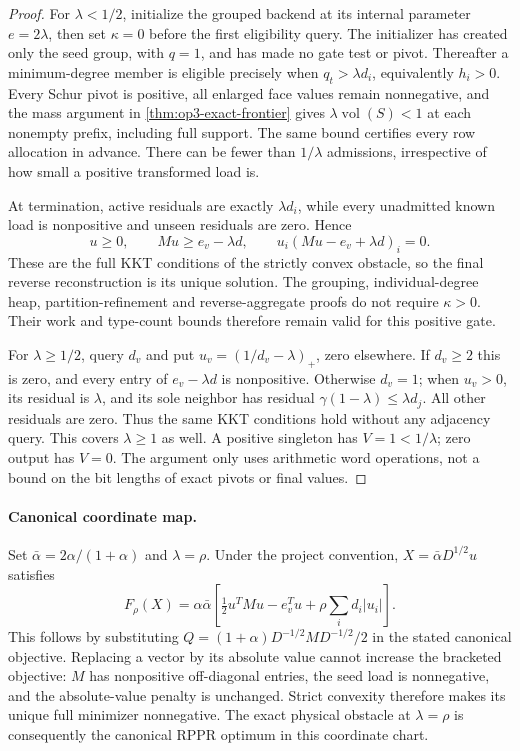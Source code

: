 \begin{proof}
For $\lambda<1/2$, initialize the grouped backend at its internal parameter
$e=2\lambda$, then set $\kappa=0$ before the first eligibility query.
The initializer has created only the seed group, with $q=1$, and has made
no gate test or pivot. Thereafter a minimum-degree member is eligible
precisely when $q_t>\lambda d_i$, equivalently $h_i>0$.
Every Schur pivot is positive, all enlarged face values remain nonnegative,
and the mass argument in \cref{thm:op3-exact-frontier} gives
$\lambda\operatorname{vol}(S)<1$ at each nonempty prefix, including full
support. The same bound certifies every row allocation in advance.
There can be fewer than $1/\lambda$ admissions, irrespective of how small
a positive transformed load is.

At termination, active residuals are exactly $\lambda d_i$, while every
unadmitted known load is nonpositive and unseen residuals are zero. Hence
\[
 u\geq0,\qquad M u\geq e_v-\lambda d,\qquad
 u_i(Mu-e_v+\lambda d)_i=0.
\]
These are the full KKT conditions of the strictly convex obstacle, so the
final reverse reconstruction is its unique solution. The grouping,
individual-degree heap, partition-refinement and reverse-aggregate proofs
do not require $\kappa>0$. Their work and type-count bounds therefore
remain valid for this positive gate.

For $\lambda\geq1/2$, query $d_v$ and put
$u_v=(1/d_v-\lambda)_+$, zero elsewhere. If $d_v\geq2$ this is zero,
and every entry of $e_v-\lambda d$ is nonpositive. Otherwise $d_v=1$;
when $u_v>0$, its residual is $\lambda$, and its sole neighbor has residual
$\gamma(1-\lambda)\leq\lambda d_j$. All other residuals are zero.
Thus the same KKT conditions hold without any adjacency query. This covers
$\lambda\geq1$ as well. A positive singleton has $V=1<1/\lambda$;
zero output has $V=0$. The argument only uses arithmetic word operations,
not a bound on the bit lengths of exact pivots or final values.
\end{proof}

\paragraph{Canonical coordinate map.}
Set $\bar\alpha=2\alpha/(1+\alpha)$ and $\lambda=\rho$. Under the
project convention, $X=\bar\alpha D^{1/2}u$ satisfies
\[
 F_\rho(X)=\alpha\bar\alpha\left[
 \tfrac12u^TMu-e_v^Tu+\rho\sum_i d_i|u_i|\right].
\]
This follows by substituting
$Q=(1+\alpha)D^{-1/2}MD^{-1/2}/2$ in the stated canonical objective.
Replacing a vector by its absolute value cannot increase the bracketed
objective: $M$ has nonpositive off-diagonal entries, the seed load is
nonnegative, and the absolute-value penalty is unchanged. Strict convexity
therefore makes its unique full minimizer nonnegative. The exact physical
obstacle at $\lambda=\rho$ is consequently the canonical RPPR optimum in
this coordinate chart.

